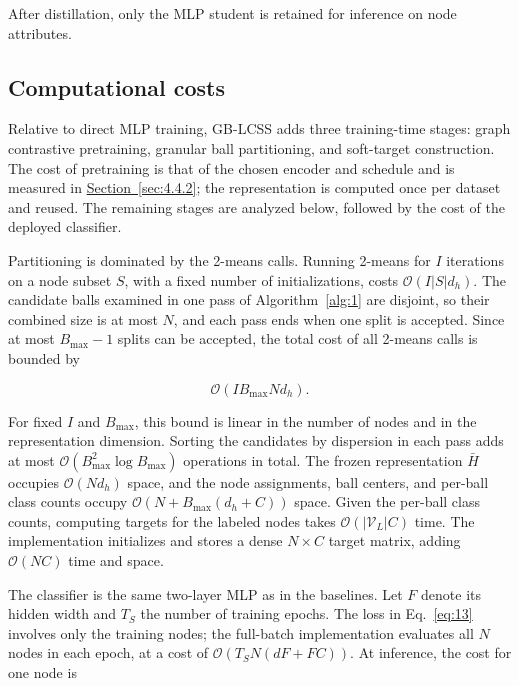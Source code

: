 \documentclass[10pt,letterpaper,nopreprintline]{elsarticle}
\theoremstyle{plain}
\begin{document}
After distillation, only the MLP student is retained for inference on node attributes.

\subsection{Computational costs}\label{sec:3.6}

Relative to direct MLP training, GB-LCSS adds three training-time stages: graph contrastive pretraining, granular ball partitioning, and soft-target construction. The cost of pretraining is that of the chosen encoder and schedule and is measured in \hyperref[sec:4.4.2]{Section~\ref*{sec:4.4.2}}; the representation is computed once per dataset and reused. The remaining stages are analyzed below, followed by the cost of the deployed classifier.

\Needspace{64pt}

Partitioning is dominated by the 2-means calls. Running 2-means for \(I\) iterations on a node subset \(S\), with a fixed number of initializations, costs \(\mathcal{O}(I|S|d_{h})\). The candidate balls examined in one pass of Algorithm~\ref{alg:1} are disjoint, so their combined size is at most \(N\), and each pass ends when one split is accepted. Since at most \(B_{\max}-1\) splits can be accepted, the total cost of all 2-means calls is bounded by

\begin{equation}\label{eq:22}
\mathcal{O}(IB_{\max}Nd_{h}).
\end{equation}

For fixed \(I\) and \(B_{\max}\), this bound is linear in the number of nodes and in the representation dimension. Sorting the candidates by dispersion in each pass adds at most \(\mathcal{O}(B_{\max}^{2}\log B_{\max})\) operations in total. The frozen representation \(\bar{H}\) occupies \(\mathcal{O}(Nd_{h})\) space, and the node assignments, ball centers, and per-ball class counts occupy \(\mathcal{O}(N + B_{\max}(d_{h} + C))\) space. Given the per-ball class counts, computing targets for the labeled nodes takes \(\mathcal{O}(|\mathcal{V}_{L}|C)\) time. The implementation initializes and stores a dense \(N \times C\) target matrix, adding \(\mathcal{O}(NC)\) time and space.

\Needspace{64pt}

The classifier is the same two-layer MLP as in the baselines. Let \(F\) denote its hidden width and \(T_{S}\) the number of training epochs. The loss in Eq.~\eqref{eq:13} involves only the training nodes; the full-batch implementation evaluates all \(N\) nodes in each epoch, at a cost of \(\mathcal{O}(T_{S}N(dF + FC))\). At inference, the cost for one node is
\end{document}
